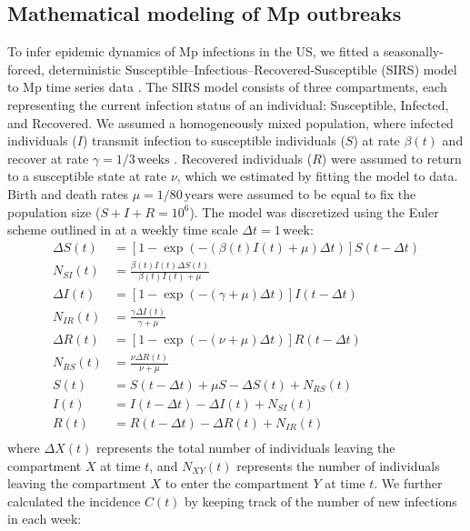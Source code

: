 \documentclass[12pt]{article}
\begin{document}
\subsection{Mathematical modeling of Mp outbreaks}

To infer epidemic dynamics of Mp infections in the US, we fitted a seasonally-forced, deterministic Susceptible–Infectious–Recovered-Susceptible (SIRS) model to Mp time series data \citep{dushoff2004dynamical,shaman2010absolute}.
The SIRS model consists of three compartments, each representing the current infection status of an individual: Susceptible, Infected, and Recovered.
We assumed a homogeneously mixed population, where infected individuals ($I$) transmit infection to susceptible individuals ($S$) at rate $\beta(t)$ and recover at rate $\gamma=1/3\,\textrm{weeks}$ \citep{omori2015determinant}.
Recovered individuals ($R$) were assumed to return to a susceptible state at rate $\nu$, which we estimated by fitting the model to data.
Birth and death rates $\mu=1/80\,\textrm{years}$ were assumed to be equal to fix the population size ($S+I+R=10^6$).
The model was discretized using the Euler scheme outlined in \cite{he2010plug} at a weekly time scale $\Delta t = 1\,\mathrm{week}$:
\begin{align}
\Delta S(t) &= \left[1- \exp(-(\beta(t) I(t) + \mu) \Delta t )\right] S(t-\Delta t)\\
N_{SI}(t) &= \frac{\beta(t) I(t)\Delta S(t)}{\beta(t) I(t) + \mu} \\
\Delta I(t) &= \left[1- \exp(-(\gamma + \mu) \Delta t )\right] I(t-\Delta t)\\
N_{IR}(t) &= \frac{\gamma \Delta I(t)}{\gamma + \mu} \\
\Delta R(t) &= \left[1- \exp(-(\nu + \mu) \Delta t )\right] R(t-\Delta t)\\
N_{RS}(t) &= \frac{\nu \Delta R(t)}{\nu + \mu} \\
S(t) &= S(t-\Delta t) + \mu S - \Delta S(t) + N_{RS}(t)  \\
I(t) &= I(t-\Delta t) - \Delta I(t) + N_{SI}(t)  \\
R(t) &= R(t-\Delta t) - \Delta R(t) + N_{IR}(t)  \\
\end{align}
where $\Delta X(t)$ represents the total number of individuals leaving the compartment $X$ at time $t$,
and $N_{XY}(t)$ represents the number of individuals leaving the compartment $X$ to enter the compartment $Y$ at time $t$.
We further calculated the incidence $C(t)$ by keeping track of the number of new infections in each week:
\end{document}
